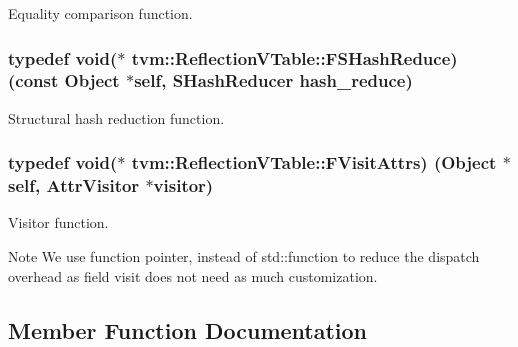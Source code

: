 Equality comparison function. 

\subsubsection[{\texorpdfstring{F\+S\+Hash\+Reduce}{FSHashReduce}}]{\setlength{\rightskip}{0pt plus 5cm}typedef void($\ast$ tvm\+::\+Reflection\+V\+Table\+::\+F\+S\+Hash\+Reduce) (const Object $\ast$self, {\bf S\+Hash\+Reducer} hash\+\_\+reduce)}\hypertarget{classtvm_1_1ReflectionVTable_a08566817a33d96cd486a780afe88aad1}{}\label{classtvm_1_1ReflectionVTable_a08566817a33d96cd486a780afe88aad1}


Structural hash reduction function. 

\subsubsection[{\texorpdfstring{F\+Visit\+Attrs}{FVisitAttrs}}]{\setlength{\rightskip}{0pt plus 5cm}typedef void($\ast$ tvm\+::\+Reflection\+V\+Table\+::\+F\+Visit\+Attrs) (Object $\ast$self, {\bf Attr\+Visitor} $\ast$visitor)}\hypertarget{classtvm_1_1ReflectionVTable_a486eb682af89ac025c0db1f8f6045b95}{}\label{classtvm_1_1ReflectionVTable_a486eb682af89ac025c0db1f8f6045b95}


Visitor function. 

\begin{DoxyNote}{Note}
We use function pointer, instead of std\+::function to reduce the dispatch overhead as field visit does not need as much customization. 
\end{DoxyNote}


\subsection{Member Function Documentation}
